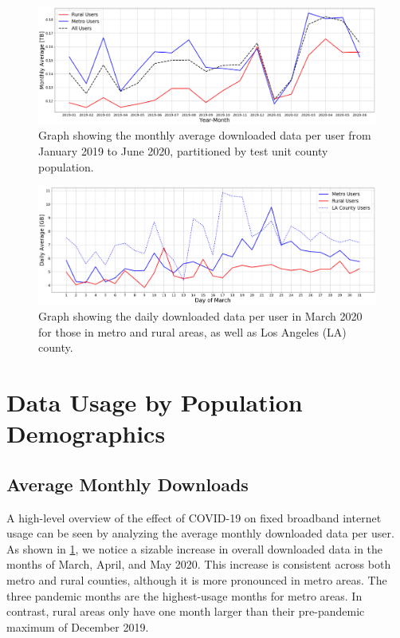 \begin{figure}[t]
    \centering
    \includegraphics[width=1.0\linewidth]{figs/monthly_downloaded_data_notitle.png}
    \caption{Graph showing the monthly average downloaded data per user from January 2019 to June 2020, partitioned by test unit county population.}
    \label{fig:downloadmetro_rural}
\end{figure}

\begin{figure}[t]
    \centering
    \includegraphics[width=1.0\linewidth]{figs/daily_downloaded_data_notitle.png}
    \caption{Graph showing the daily downloaded data per user in March 2020 for those in metro and rural areas, as well as Los Angeles (LA) county.}
    \label{fig:dailymetro_rural}
\end{figure}

\section{Data Usage by Population Demographics}\label{sec:data-usage-by-population-demographics}

\subsection{Average Monthly Downloads}

A high-level overview of the effect of COVID-19 on fixed broadband internet usage can be seen by analyzing the average monthly downloaded data per user. As shown in \cref{fig:downloadmetro_rural}, we notice a sizable increase in overall downloaded data in the months of March, April, and May 2020. This increase is consistent across both metro and rural counties, although it is more pronounced in metro areas. The three pandemic months are the highest-usage months for metro areas. In contrast, rural areas only have one month larger than their pre-pandemic maximum of December 2019.

